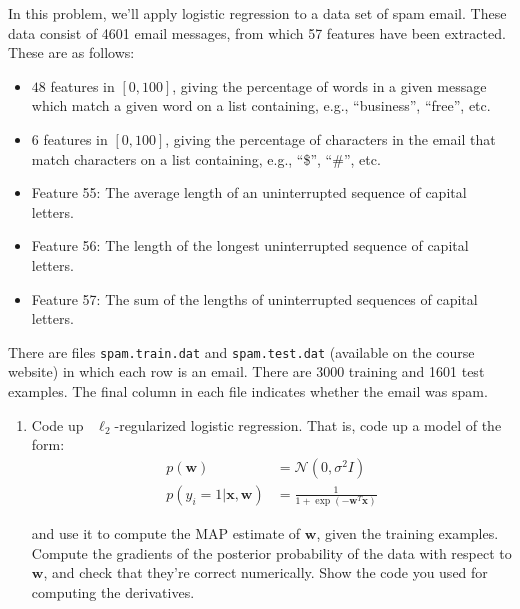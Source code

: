 \documentclass{harvardml}
\begin{document}
\begin{problem}
In this problem, we'll apply logistic regression to a data set of spam
email.  These data consist of 4601 email messages, from which 57
features have been extracted.  These are as follows:
\begin{itemize}
  \item $48$ features in $[0,100]$, giving the percentage of words in
    a given message which match a given word on a list containing,
    e.g., ``business'', ``free'', etc.
  \item $6$ features in $[0,100]$, giving the percentage of characters
    in the email that match characters on a list containing, e.g.,
    ``\$'', ``\#'', etc.
  \item Feature 55: The average length of an uninterrupted sequence of
    capital letters.
  \item Feature 56: The length of the longest uninterrupted sequence
    of capital letters.
  \item Feature 57: The sum of the lengths of uninterrupted sequences
    of capital letters.
\end{itemize}
There are files \texttt{spam.train.dat} and \texttt{spam.test.dat}
(available on the course website) in which each row is an email.
There are 3000 training and 1601 test examples.  The final column in
each file indicates whether the email was spam.

\begin{enumerate}
  \item Code up ~$\ell_2$-regularized logistic regression.
  That is, code up a model of the form:
  \begin{align}
  p(\mathbf{w}) & = \mathcal{N}(0, \sigma^2 I) \\
  p(y_i = 1 | \mathbf{x}, \mathbf{w}) & = \frac{1}{1 + \exp(-\mathbf{w}^T \mathbf{x})}
  \end{align}

  and use it to compute the MAP estimate of $\mathbf{w}$, given the training examples.
  Compute the gradients of the posterior probability of the data with respect to $\mathbf{w}$, and check that they're correct numerically.
  Show the code you used for computing the derivatives. 
  

\end{enumerate}
\end{problem}
\end{document}
